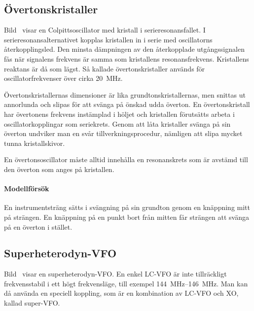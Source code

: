 \subsection{Övertonskristaller}


Bild~ visar en Colpittsoscillator med kristall i
serieresonansfallet.
I serieresonansalternativet kopplas kristallen in i serie med
oscillatorns återkopplingsled.
Den minsta dämpningen av den återkopplade utgångssignalen fås när signalens
frekvens är samma som kristallens resonansfrekvens.
Kristallens reaktans är då som lägst.
Så kallade övertonskristaller används för oscillatorfrekvenser över cirka
\qty{20}{\mega\hertz}.

Övertonskristallernas dimensioner är lika grundtonskristallernas, men
snittas ut annorlunda och slipas för att svänga på önskad udda överton.
En övertonskristall har övertonens frekvens instämplad i höljet och kristallen
förutsätts arbeta i oscillatorkopplingar som seriekrets.
Genom att låta kristaller svänga på sin överton undviker man en svår
tillverkningsprocedur, nämligen att slipa mycket tunna kristallskivor.

En övertonsoscillator måste alltid innehålla en resonanskrets som är
avstämd till den överton som anges på kristallen.

\paragraph{Modellförsök}
En instrumentsträng sätts i svängning på sin grundton genom en knäppning mitt
på strängen.
En knäppning på en punkt bort från mitten får strängen att svänga på en överton
i stället.

\subsection{Superheterodyn-VFO}
\label{superVFO}


Bild~ visar en superheterodyn-VFO.
En enkel LC-VFO är inte tillräckligt frekvensstabil i ett högt frekvensläge,
till exempel \SIrange{144}{146}{\mega\hertz}.
Man kan då använda en speciell koppling, som är en kombination av LC-VFO och
XO, kallad super-VFO.

